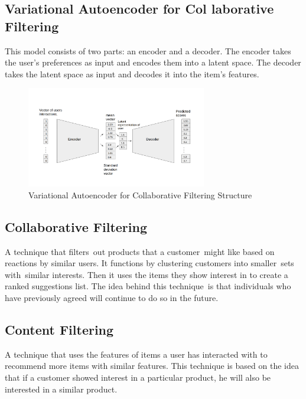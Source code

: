 \subsection{Variational Autoencoder for Col laborative Filtering}
This model consists of two parts: an encoder and a decoder. The encoder takes the user's preferences as input and encodes them into a latent space. The decoder takes the latent space as input and decodes it into the item's features.
\begin{figure}[H]
    \centering
    \includegraphics[width=0.7\textwidth]{assets/variational-autoencoder.png}
    \caption[Variational Autoencoder for Collaborative Filtering Structure]{Variational Autoencoder for Collaborative Filtering Structure \cite{NvidiaRecSys}}
    \label{fig:variational-autoencoder-for-collaborative-filtering}
\end{figure}
\subsection{Collaborative Filtering}
A technique that filters out products that a customer might like based on reactions by similar users. It functions by clustering customers into smaller sets with similar interests. Then it uses the items they show interest in to create a ranked suggestions list. The idea behind this technique is that individuals who have previously agreed will continue to do so in the future.
\subsection{Content Filtering}
A technique that uses the features of items a user has interacted with to recommend more items with similar features. This technique is based on the idea that if a customer showed interest in a particular product, he will also be interested in a similar product. \\



